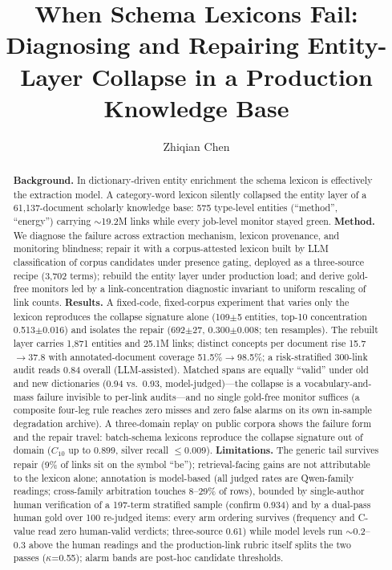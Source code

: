 \documentclass[preprint,12pt]{elsarticle}
\begin{document}
\begin{frontmatter}
\title{When Schema Lexicons Fail: Diagnosing and Repairing Entity-Layer
Collapse in a Production Knowledge Base}
\author[addr1]{Zhiqian Chen}
\address[addr1]{Chengdu University of Technology, Chengdu, China}

\begin{abstract}
\textbf{Background.} In dictionary-driven entity enrichment the schema
lexicon is effectively the extraction model. A category-word lexicon
silently collapsed the entity layer of a 61{,}137-document scholarly
knowledge base: 575 type-level entities (``method'', ``energy'')
carrying ${\sim}$19.2M links while every job-level monitor stayed
green. \textbf{Method.} We diagnose the failure across extraction
mechanism, lexicon provenance, and monitoring blindness; repair it with
a corpus-attested lexicon built by LLM classification of corpus
candidates under presence gating, deployed as a three-source recipe
(3{,}702 terms);
rebuild the entity layer under production load; and derive gold-free
monitors led by a link-concentration diagnostic invariant to uniform
rescaling of link counts. \textbf{Results.} A fixed-code, fixed-corpus
experiment that varies only the lexicon reproduces the collapse
signature alone (109$\pm$5 entities, top-10 concentration
0.513$\pm$0.016) and isolates the repair (692$\pm$27, 0.300$\pm$0.008;
ten resamples). The rebuilt layer carries 1{,}871 entities and 25.1M
links; distinct concepts per document rise 15.7$\to$37.8 with
annotated-document coverage 51.5\%$\to$98.5\%; a risk-stratified
300-link audit reads 0.84 overall (LLM-assisted). Matched spans are equally ``valid'' under old and new
dictionaries (0.94 vs.\ 0.93, model-judged)---the collapse is a
vocabulary-and-mass failure invisible to per-link audits---and no
single gold-free monitor suffices (a composite four-leg rule reaches
zero misses and zero false alarms on its own in-sample degradation
archive). A three-domain replay on public corpora shows
the failure form and the repair travel: batch-schema lexicons
reproduce the collapse signature out of domain ($C_{10}$ up to 0.899,
silver recall ${\le}$0.009). \textbf{Limitations.} The generic tail
survives repair (9\% of links sit on the symbol ``be'');
retrieval-facing gains are not attributable to the lexicon alone;
annotation is model-based (all judged rates are Qwen-family
readings; cross-family arbitration touches 8--29\% of rows), bounded
by single-author human verification of a 197-term stratified sample
(confirm 0.934) and by a dual-pass human gold over 100 re-judged
items: every arm ordering survives (frequency and C-value read zero
human-valid verdicts; three-source 0.61) while model levels run
${\sim}$0.2--0.3 above the human readings and the production-link
rubric itself splits the two passes ($\kappa$=0.55); alarm bands are
post-hoc candidate thresholds.
\end{abstract}


\end{frontmatter}
\end{document}

